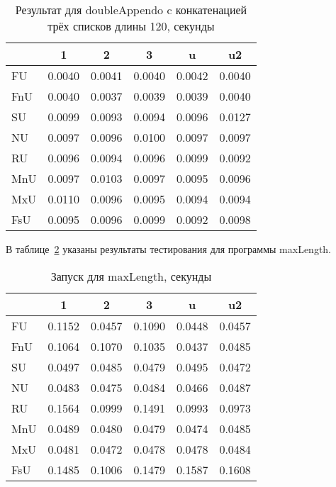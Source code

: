 \begin{table}[h!]
\center
\begin{tabular}{|l|c|c|c|c|c|}
\hline
   &     1   &    2   &      3 &    u   &   u2 \\ \hline
FU & 0.0040 & 0.0041 &0.0040 & 0.0042 &0.0040  \\ \hline
FnU& 0.0040 & 0.0037 &0.0039 & 0.0039 &0.0040  \\ \hline
SU & 0.0099 & 0.0093 &0.0094 & 0.0096 &0.0127  \\ \hline
NU & 0.0097 & 0.0096 &0.0100 & 0.0097 &0.0097  \\ \hline
RU & 0.0096 & 0.0094 &0.0096 & 0.0099 &0.0092  \\ \hline
MnU& 0.0097 & 0.0103 &0.0097 & 0.0095 &0.0096  \\ \hline
MxU& 0.0110 & 0.0096 &0.0095 & 0.0094 &0.0094  \\ \hline
FsU& 0.0095 & 0.0096 &0.0099 & 0.0092 &0.0098  \\ \hline
\end{tabular}
\caption{Результат для doubleAppendo c конкатенацией трёх списков длины 120, секунды}
\label{fig:dappTest}
\end{table}

В таблице~\ref{fig:maxlenTest} указаны результаты тестирования для
программы maxLength. 

\begin{table}[h!]
\center
\begin{tabular}{|l|c|c|c|c|c|}
\hline
   &     1    &    2   &       3 &    u   &   u2 \\ \hline
FU & 0.1152 & 0.0457 &  0.1090 & 0.0448 & 0.0457 \\ \hline
FnU& 0.1064 & 0.1070 &  0.1035 & 0.0437 & 0.0485 \\ \hline
SU & 0.0497 & 0.0485 &  0.0479 & 0.0495 & 0.0472 \\ \hline
NU & 0.0483 & 0.0475 &  0.0484 & 0.0466 & 0.0487 \\ \hline
RU & 0.1564 & 0.0999 &  0.1491 & 0.0993 & 0.0973 \\ \hline
MnU& 0.0489 & 0.0480 &  0.0479 & 0.0474 & 0.0485 \\ \hline
MxU& 0.0481 & 0.0472 &  0.0478 & 0.0478 & 0.0484 \\ \hline
FsU& 0.1485 & 0.1006 &  0.1479 & 0.1587 & 0.1608 \\ \hline
\end{tabular}
\caption{Запуск для maxLength, секунды}
\label{fig:maxlenTest}
\end{table}

